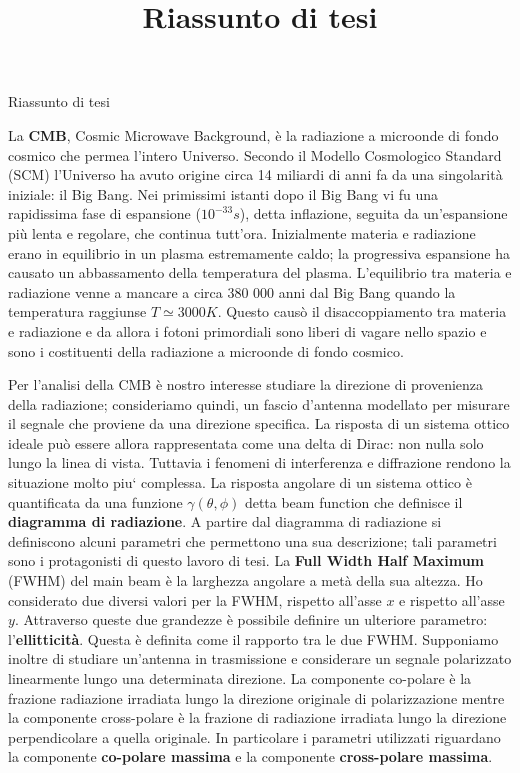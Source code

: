 \documentclass[12pt,a4paper,final]{report}			%
\title{Riassunto di tesi}
\begin{document}
\begin{center}
	\Huge 
	Riassunto di tesi
\end{center}
\medskip 

La \textbf{CMB}, Cosmic Microwave Background, \`e la radiazione a microonde di fondo cosmico che permea l’intero Universo. Secondo il Modello Cosmologico Standard (SCM) l’Universo ha avuto origine circa 14 miliardi di anni fa da una singolarit\`a iniziale: il Big Bang. Nei primissimi istanti dopo il Big Bang vi fu una rapidissima fase di espansione ($10^{-33}\unit{s}$), detta inflazione, seguita da un’espansione più lenta e regolare, che continua tutt’ora. Inizialmente materia e radiazione erano in equilibrio in un plasma estremamente caldo; la progressiva espansione ha causato un abbassamento della temperatura del plasma. L’equilibrio tra materia e radiazione venne a mancare a circa 380 000 anni dal Big Bang quando la temperatura raggiunse $T\simeq3000\unit{K}$. Questo caus\`o il disaccoppiamento tra materia e radiazione e da allora i fotoni primordiali sono liberi di vagare nello spazio e sono i costituenti della radiazione a microonde di fondo cosmico.

Per l’analisi della CMB \`e nostro interesse studiare la direzione di provenienza della radiazione; consideriamo quindi, un fascio d’antenna modellato per misurare il segnale che proviene da una direzione specifica. La risposta di un sistema ottico ideale pu\`o essere allora rappresentata come una delta di Dirac: non nulla solo lungo la linea di vista. Tuttavia i fenomeni di interferenza e diffrazione rendono la situazione molto piu` complessa. La risposta angolare di un sistema ottico è quantificata da una funzione $\gamma(\theta,\phi)$ detta beam function che definisce il \textbf{diagramma di radiazione}.
A partire dal diagramma di radiazione si definiscono alcuni parametri che permettono una sua descrizione; tali parametri sono i protagonisti di questo lavoro di tesi.
La \textbf{Full Width Half Maximum} (FWHM) del main beam è la larghezza angolare a metà della sua altezza. Ho considerato due diversi valori per la FWHM, rispetto all'asse $x$ e rispetto all'asse $y$. Attraverso queste due grandezze è possibile definire un ulteriore parametro: l'\textbf{ellitticità}. Questa è definita come il rapporto tra le due FWHM.
Supponiamo inoltre di studiare un'antenna in trasmissione e considerare un segnale polarizzato linearmente lungo una determinata direzione. La componente co-polare è la frazione radiazione irradiata lungo la direzione originale di polarizzazione mentre la componente cross-polare è la frazione di radiazione irradiata lungo la direzione perpendicolare a quella originale. In particolare i parametri utilizzati riguardano la componente \textbf{co-polare massima} e la componente \textbf{cross-polare massima}.
\end{document}
